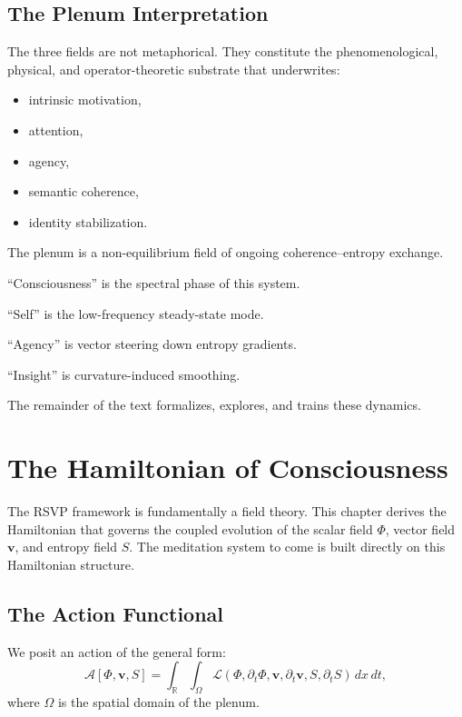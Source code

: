 \documentclass[12pt]{article}
\begin{document}
\section{The Plenum Interpretation}

The three fields are not metaphorical. They constitute the phenomenological,
physical, and operator-theoretic substrate that underwrites:

\begin{itemize}
\item intrinsic motivation,
\item attention,
\item agency,
\item semantic coherence,
\item identity stabilization.
\end{itemize}

The plenum is a non-equilibrium field of ongoing coherence--entropy exchange.

``Consciousness'' is the spectral phase of this system.

``Self'' is the low-frequency steady-state mode.

``Agency'' is vector steering down entropy gradients.

``Insight'' is curvature-induced smoothing.

The remainder of the text formalizes, explores, and trains these dynamics.


\chapter{The Hamiltonian of Consciousness}

The RSVP framework is fundamentally a field theory.  
This chapter derives the Hamiltonian that governs the coupled evolution of
the scalar field $\Phi$, vector field $\mathbf{v}$, and entropy field $S$.
The meditation system to come is built directly on this Hamiltonian structure.

\section{The Action Functional}

We posit an action of the general form:
\[
\mathcal{A}[\Phi, \mathbf{v}, S]
=
\int_{\mathbb{R}}\!\!\int_{\Omega}
\mathcal{L}(\Phi, \partial_t \Phi,
\mathbf{v}, \partial_t \mathbf{v},
S, \partial_t S)
\, dx\, dt,
\]
where $\Omega$ is the spatial domain of the plenum.
\end{document}
